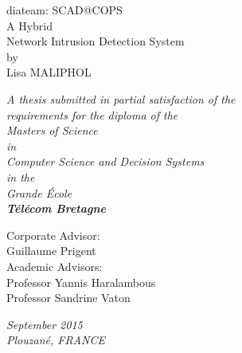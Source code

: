 \documentclass[11pt,]{article}
\begin{document}
\begin{center}

\vspace{30mm}

{\Huge diateam: SCAD@COPS}\\
\bigskip
{\Huge A Hybrid}\\
{\Huge Network Intrusion Detection System}\\
\vspace{25mm}
{\Large by}\\
\vspace{10mm}
{\huge Lisa MALIPHOL}\\

\vspace{25mm}

\textit{A thesis submitted in partial satisfaction of the}\\
\medskip
\textit{requirements for the diploma of the}\\
\medskip
\textit{Masters of Science}\\
\medskip
\textit{in}\\
\medskip
\textit{Computer Science and Decision Systems}\\
\medskip
\textit{in the}\\
\medskip
\textit{Grande École}\\
\medskip
\textbf{\textit{\Large Télécom Bretagne}}\\

\vspace{25mm}

Corporate Advisor:\\
\smallskip
Guillaume Prigent\\
\bigskip
\medskip
Academic Advisors:\\
\smallskip
Professor Yannis Haralambous\\
Professor Sandrine Vaton\\

\vspace{15mm}

\textit{September 2015}\\
\medskip
\textit{Plouzané, FRANCE}\\

\end{center}

\thispagestyle{empty} \newpage
\mbox{} \thispagestyle{empty}

\newpage
\end{document}
